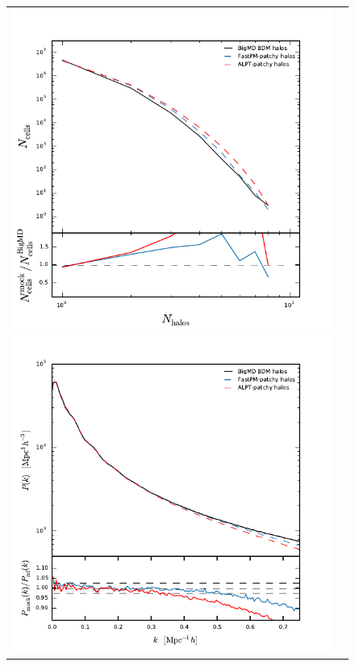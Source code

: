 \documentclass[english,usenatbib]{mn2e}
\begin{document}
\begin{figure}
 \begin{tabular}{cc}
\includegraphics[width=\columnwidth]{pdf}
\includegraphics[width=\columnwidth]{pk}

\end{tabular}
\end{figure}
\end{document}

